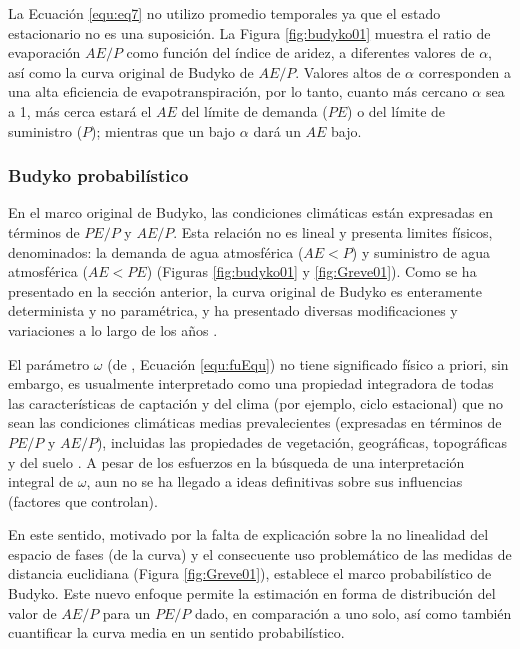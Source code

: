 \documentclass[12pt]{article}
\begin{document}


La Ecuación \ref{equ:eq7} no utilizo promedio temporales ya que el estado estacionario no es una suposición. La Figura \ref{fig:budyko01} muestra el ratio de evaporación $AE/P$ como función del índice de aridez, a diferentes valores de $\alpha$, así como la curva original de Budyko de $AE/P$. Valores altos de $\alpha$ corresponden a una alta eficiencia de evapotranspiración, por lo tanto, cuanto más cercano $\alpha$ sea a 1, más cerca estará el $AE$ del límite de demanda ($PE$) o del límite de suministro ($P$); mientras que un bajo $\alpha$ dará un $AE$ bajo.



\subsubsection{Budyko probabilístico}

En el marco original de Budyko, las condiciones climáticas están expresadas en términos de $PE/P$ y $AE/P$. Esta relación no es lineal y presenta limites físicos, denominados: la demanda de agua atmosférica ($AE < P$) y suministro de agua atmosférica ($AE < PE$) (Figuras \ref{fig:budyko01} y \ref{fig:Greve01}). Como se ha presentado en la sección anterior, la curva original de Budyko es enteramente determinista y no paramétrica, y ha presentado diversas modificaciones y variaciones a lo largo de los años \citep{Budyko1961,Fu1981,Koster1999,Wang2014,Zhang2004,Zhang2008,fathi2019new}. 



El parámetro $\omega$ (de \citet{Fu1981}, Ecuación \ref{equ:fuEqu}) no tiene significado físico a priori, sin embargo, es usualmente interpretado como una propiedad integradora de todas las características de captación y del clima (por ejemplo, ciclo estacional) que no sean las condiciones climáticas medias prevalecientes (expresadas en términos de $PE/P$ y $AE/P$), incluidas las propiedades de vegetación, geográficas, topográficas y del suelo \citep{Gentine2012,Berghuijs2014,Greve2015}. A pesar de los esfuerzos en la búsqueda de una interpretación integral de $\omega$, aun no se ha llegado a ideas definitivas sobre sus influencias (factores que controlan).

En este sentido, \citet{Greve2015} motivado por la falta de explicación sobre la no linealidad del espacio de fases (de la curva) y el consecuente uso problemático de las medidas de distancia euclidiana (Figura \ref{fig:Greve01}), establece el marco probabilístico de Budyko. Este nuevo enfoque permite la estimación en forma de distribución del  valor de $AE/P$ para un $PE/P$ dado, en comparación a uno solo, así como también cuantificar la curva media en un sentido probabilístico.
\end{document}
